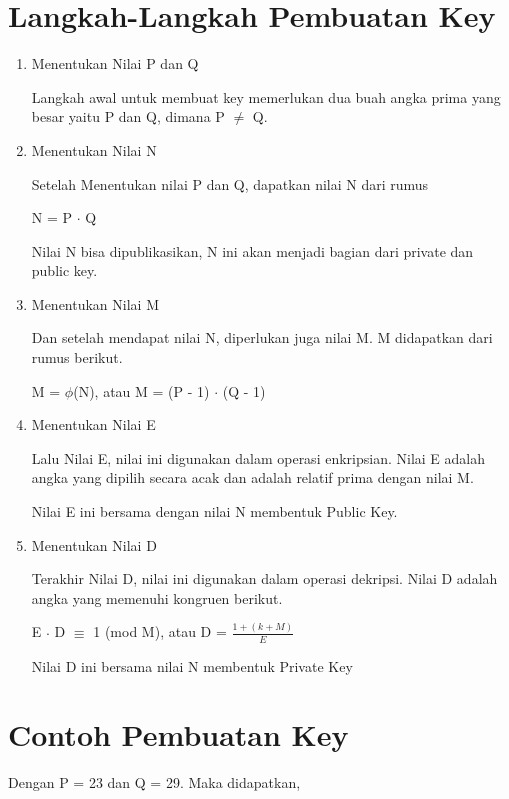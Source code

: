 \documentclass[11pt, a4paper]{article}
\date{}
\begin{document}
\section* {Langkah-Langkah Pembuatan Key}

  \begin{enumerate}
    \item Menentukan Nilai P dan Q

      Langkah awal untuk membuat key memerlukan
      dua buah angka prima yang besar yaitu P dan Q, dimana P $\neq$ Q.

    \item Menentukan Nilai N

      Setelah Menentukan nilai P dan Q, dapatkan nilai N dari rumus

      N = P $\cdot$ Q

      Nilai N bisa dipublikasikan, N ini akan menjadi bagian dari private dan public key.

    \item Menentukan Nilai M

      Dan setelah mendapat nilai N, diperlukan juga nilai M. M didapatkan dari rumus
      berikut.

      M = $\phi$(N), atau M = (P - 1) $\cdot$ (Q - 1)

    \item Menentukan Nilai E

      Lalu Nilai E, nilai ini digunakan dalam operasi enkripsian. Nilai E adalah
      angka yang dipilih secara acak dan adalah relatif prima dengan nilai M.

      Nilai E ini bersama dengan nilai N membentuk Public Key.

    \item Menentukan Nilai D

      Terakhir Nilai D, nilai ini digunakan dalam operasi dekripsi. Nilai D adalah
      angka yang memenuhi kongruen berikut.

       E $\cdot$ D $\equiv$ 1 (mod M), atau D = $\frac{1 + (k + M)}{E}$

      Nilai D ini bersama nilai N membentuk Private Key

  \end{enumerate}
\newpage
\section*{Contoh Pembuatan Key}

Dengan P = 23 dan Q = 29. Maka didapatkan,
\end{document}
